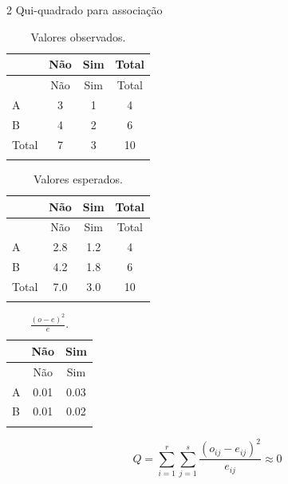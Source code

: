\documentclass[
  ignorenonframetext,
  serif,
  professionalfont,
  usenames,
  dvipsnames,
  aspectratio = 169]{beamer}
\def\beginAHalfColumn{\begin{minipage}{0.49\textwidth}}%
\def\endColumns{\end{minipage}}%
\begin{document}
\begin{frame}{2 Qui-quadrado para associação}
\label{qui-quadrado-para-associauxe7uxe3o}
\beginAHalfColumn

\begin{longtable}[]{@{}lccc@{}}
\caption{Valores observados.}\tabularnewline
\toprule\noalign{}
& Não & Sim & Total \\
\midrule\noalign{}
\endfirsthead
\toprule\noalign{}
& Não & Sim & Total \\
\midrule\noalign{}
\endhead
A & 3 & 1 & 4 \\
B & 4 & 2 & 6 \\
Total & 7 & 3 & 10 \\
\bottomrule\noalign{}
\end{longtable}

\begin{longtable}[]{@{}lccc@{}}
\caption{Valores esperados.}\tabularnewline
\toprule\noalign{}
& Não & Sim & Total \\
\midrule\noalign{}
\endfirsthead
\toprule\noalign{}
& Não & Sim & Total \\
\midrule\noalign{}
\endhead
A & 2.8 & 1.2 & 4 \\
B & 4.2 & 1.8 & 6 \\
Total & 7.0 & 3.0 & 10 \\
\bottomrule\noalign{}
\end{longtable}

\endColumns
\beginAHalfColumn

\begin{longtable}[]{@{}lcc@{}}
\caption{\(\frac{(o-e)^2}{e}\).}\tabularnewline
\toprule\noalign{}
& Não & Sim \\
\midrule\noalign{}
\endfirsthead
\toprule\noalign{}
& Não & Sim \\
\midrule\noalign{}
\endhead
A & 0.01 & 0.03 \\
B & 0.01 & 0.02 \\
\bottomrule\noalign{}
\end{longtable}

\[Q = \sum_{i=1}^{r} \sum_{j=1}^{s} \frac{(o_{ij} - e_{ij})^2}{e_{ij}} \approx  0\]
\endColumns
\end{frame}
\end{document}
